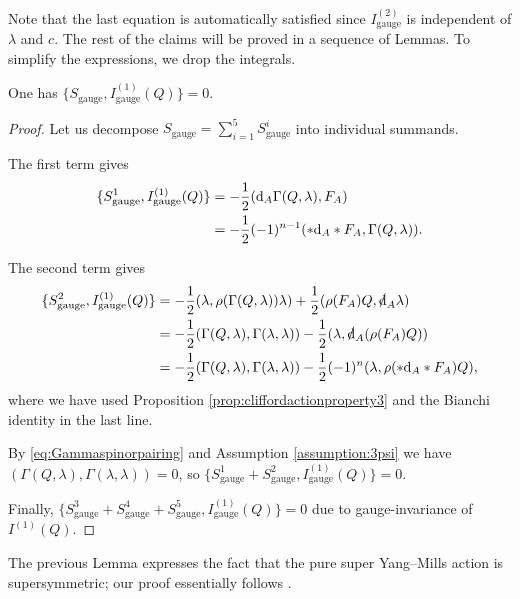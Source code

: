 \documentclass[10pt, oneside]{article}
\newcommand{\gauge}{\mathrm{gauge}}
\begin{document}
Note that the last equation is automatically satisfied since $I_{\gauge}^{(2)}$ is independent of $\lambda$ and $c$. The rest of the claims will be proved in a sequence of Lemmas. To simplify the expressions, we drop the integrals.

\begin{lemma}
One has $\{S_{\gauge}, I_{\gauge}^{(1)}(Q)\} = 0$.
\label{lm:gaugemultiplet1}
\end{lemma}
\begin{proof}
Let us decompose $S_{\gauge} = \sum_{i=1}^5 S_{\gauge}^i$ into individual summands.

The first term gives
\begin{align*}
\{S_{\gauge}^1, I_{\gauge}^{(1)}(Q)\} &= -\frac{1}{2} (\d_A \Gamma(Q, \lambda), F_A)\\
&= -\frac{1}{2}(-1)^{n-1} (\ast \d_A \ast F_A, \Gamma(Q, \lambda)).
\end{align*}

The second term gives
\begin{align*}
\{S_{\gauge}^2, I_{\gauge}^{(1)}(Q)\} &= -\frac{1}{2}(\lambda, \rho(\Gamma(Q, \lambda))\lambda) + \frac{1}{2}(\rho(F_A) Q, \sd{\d}_A\lambda) \\
&= -\frac{1}{2}(\Gamma(Q, \lambda), \Gamma(\lambda, \lambda))  - \frac{1}{2}(\lambda, \sd{\d}_A(\rho(F_A) Q)) \\
&= -\frac{1}{2}(\Gamma(Q, \lambda), \Gamma(\lambda, \lambda)) - \frac{1}{2} (-1)^n (\lambda, \rho(\ast \d_A\ast F_A) Q),
\end{align*}
where we have used Proposition \ref{prop:cliffordactionproperty3} and the Bianchi identity in the last line.

By \eqref{eq:Gammaspinorpairing} and Assumption \ref{assumption:3psi} we have $(\Gamma(Q, \lambda), \Gamma(\lambda, \lambda)) = 0$, so $\{S_{\gauge}^1 + S_{\gauge}^2, I_{\gauge}^{(1)}(Q)\} = 0$.

Finally, $\{S_{\gauge}^3 + S_{\gauge}^4 + S_{\gauge}^5, I_{\gauge}^{(1)}(Q)\} = 0$ due to gauge-invariance of $I^{(1)}(Q)$.
\end{proof}

\begin{remark}
The previous Lemma expresses the fact that the pure super Yang--Mills action is supersymmetric; our proof essentially follows \cite{BaezHuerta}.
\end{remark}
\end{document}
